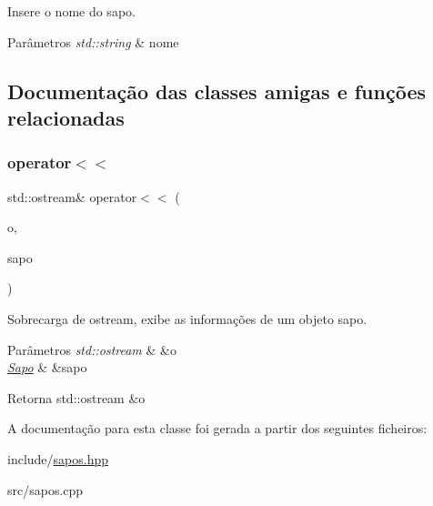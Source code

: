 Insere o nome do sapo. 


\begin{DoxyParams}{Parâmetros}
{\em std\+::string} & nome \\
\hline
\end{DoxyParams}


\subsection{Documentação das classes amigas e funções relacionadas}
\mbox{\label{classSapo_a295992e9cef7ed41031bd2a0a9e70646}} 
\subsubsection{\texorpdfstring{operator$<$$<$}{operator<<}}
{\footnotesize\ttfamily std\+::ostream\& operator$<$$<$ (\begin{DoxyParamCaption}\item[{std\+::ostream \&}]{o,  }\item[{\hyperlink{classSapo}{Sapo} \&}]{sapo }\end{DoxyParamCaption})\hspace{0.3cm}{\ttfamily [friend]}}



Sobrecarga de ostream, exibe as informações de um objeto sapo. 


\begin{DoxyParams}{Parâmetros}
{\em std\+::ostream} & \&o \\
\hline
{\em \hyperlink{classSapo}{Sapo}} & \&sapo \\
\hline
\end{DoxyParams}
\begin{DoxyReturn}{Retorna}
std\+::ostream \&o 
\end{DoxyReturn}


A documentação para esta classe foi gerada a partir dos seguintes ficheiros\+:\begin{DoxyCompactItemize}
\item 
include/\hyperlink{sapos_8hpp}{sapos.\+hpp}\item 
src/sapos.\+cpp\end{DoxyCompactItemize}
